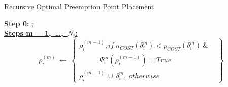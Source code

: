 {\fontsize{10}{10}\selectfont
\begin{algorithm}
\caption{Recursive Optimal Preemption Point Placement}
\label{alg:recursive-optimal-ppp}
\begin{algorithmic}[0]
\small
\State \textbf{\underline{Step 0:}}
;
\\
\State \textbf{\underline{Steps m = 1,\ \ldots,\ $N_{i}$:}}
\begin{equation*}
\rho_{i}^{(m)}\ \gets\
\left\{
\begin{array}{l}
    \rho_{i}^{(m-1)}, if\ n_{COST}(\delta_{i}^{m}) < p_{COST}(\delta_{i}^{m})\ \&\ \ \ \ \\
    \ \ \ \ \ \ \ \ \ \ \ \ \ \Psi_{i}^{m}(\rho_{i}^{(m-1)}) = True\\
    \rho_{i}^{(m-1)}\ \cup\ \delta_{i}^{m},\ otherwise
\end{array}
\right\}~
\end{equation*}
\normalsize
\end{algorithmic}
\end{algorithm}
}
